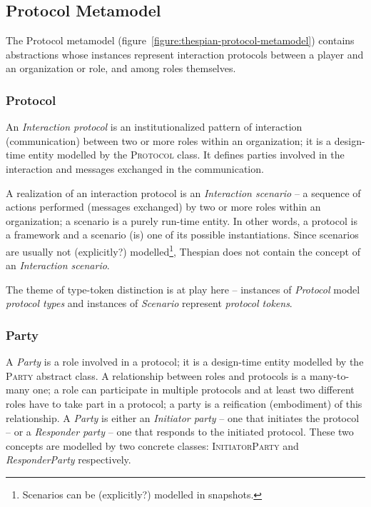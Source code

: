 \subsection{Protocol Metamodel}

The Protocol metamodel (figure~\ref{figure:thespian-protocol-metamodel}) contains abstractions whose instances represent interaction protocols between a player and an organization or role, and among roles themselves.

\subsubsection*{Protocol}

An \textit{Interaction protocol} is an institutionalized pattern of interaction (communication) between two or more roles within an organization; it is a design-time entity modelled by the \textsc{Protocol} class.
It defines parties involved in the interaction and messages exchanged in the communication.

A realization of an interaction protocol is an \textit{Interaction scenario} -- a sequence of actions performed (messages exchanged) by two or more roles within an organization; a scenario is a purely run-time entity.
In other words, a protocol is a framework and a scenario (is) one of its possible instantiations.
Since scenarios are usually not (explicitly?) modelled\footnote{Scenarios can be (explicitly?) modelled in snapshots.}, Thespian does not contain the concept of an \textit{Interaction scenario}.

The theme of type-token distinction is at play here -- instances of \textit{Protocol} model \textit{protocol types} and instances of \textit{Scenario} represent \textit{protocol tokens}.

\subsubsection*{Party}

A \textit{Party} is a role involved in a protocol; it is a design-time entity modelled by the \textsc{Party} abstract class.
A relationship between roles and protocols is a many-to-many one; a role can participate in multiple protocols and at least two different roles have to take part in a protocol; a party is a reification (embodiment) of this relationship.
A \textit{Party} is either an \textit{Initiator party} -- one that initiates the protocol -- or a \textit{Responder party} -- one that responds to the initiated protocol. These two concepts are modelled by two concrete classes: \textsc{InitiatorParty} and \textsl{ResponderParty} respectively.


